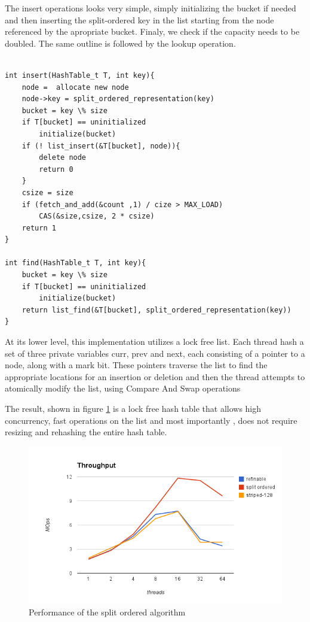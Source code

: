 The insert operations looks very simple, simply initializing the bucket if needed and then inserting the split-ordered key in the list starting from the node referenced by the apropriate bucket. Finaly, we check if the capacity needs to be doubled. The same outline is followed by the lookup operation.

\begin{lstlisting}[caption={Insert and Loopkup operations of the split ordered algorithm}]

int insert(HashTable_t T, int key){
	node =  allocate new node
	node->key = split_ordered_representation(key)
	bucket = key \% size
	if T[bucket] == uninitialized
		initialize(bucket)
	if (! list_insert(&T[bucket], node)){
		delete node
		return 0
	}
	csize = size
	if (fetch_and_add(&count ,1) / cize > MAX_LOAD)
		CAS(&size,csize, 2 * csize)
	return 1
}

int find(HashTable_t T, int key){
	bucket = key \% size
	if T[bucket] == uninitialized
		initialize(bucket)
	return list_find(&T[bucket], split_ordered_representation(key))
}

\end{lstlisting}

At its lower level, this implementation utilizes a lock free list. Each thread hash a set of three private variables curr, prev and next, each consisting of a pointer to a node, along with a mark bit. These pointers traverse the list to find the appropriate locations for an insertion or deletion and then the thread attempts to atomically modify the list, using Compare And Swap operations

The result, shown in figure \ref{hashes_split_ordered_perf} is a lock free hash table that allows high concurrency, fast operations on the list and most importantly , does not require resizing and rehashing the entire hash table.

\begin{figure}
 \centering
  \includegraphics[scale=0.7]{hashes_split_ordered_perf.png}
\caption{Performance of the split ordered algorithm}
\label{hashes_split_ordered_perf}
\end{figure}

